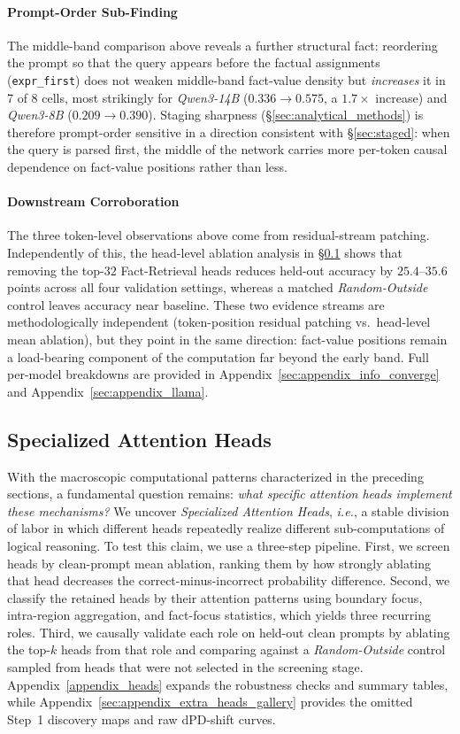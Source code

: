 \documentclass[11pt]{article}
\begin{document}
\paragraph{Prompt-Order Sub-Finding} The middle-band comparison above reveals a further structural fact: reordering the prompt so that the query appears before the factual assignments (\texttt{expr\_first}) does not weaken middle-band fact-value density but \emph{increases} it in 7 of 8 cells, most strikingly for \textit{Qwen3-14B} ($0.336 \to 0.575$, a $1.7\times$ increase) and \textit{Qwen3-8B} ($0.209 \to 0.390$). Staging sharpness (§\ref{sec:analytical_methods}) is therefore prompt-order sensitive in a direction consistent with §\ref{sec:staged}: when the query is parsed first, the middle of the network carries more per-token causal dependence on fact-value positions rather than less.

\paragraph{Downstream Corroboration} The three token-level observations above come from residual-stream patching. Independently of this, the head-level ablation analysis in §\ref{sec:heads} shows that removing the top-$32$ Fact-Retrieval heads reduces held-out accuracy by $25.4$--$35.6$ points across all four validation settings, whereas a matched \textit{Random-Outside} control leaves accuracy near baseline. These two evidence streams are methodologically independent (token-position residual patching vs.\ head-level mean ablation), but they point in the same direction: fact-value positions remain a load-bearing component of the computation far beyond the early band. Full per-model breakdowns are provided in Appendix~\ref{sec:appendix_info_converge} and Appendix~\ref{sec:appendix_llama}.

\subsection{Specialized Attention Heads}
\label{sec:heads}
With the macroscopic computational patterns characterized in the preceding sections, a fundamental question remains: \textit{what specific attention heads implement these mechanisms?} 
We uncover \textit{Specialized Attention Heads}, \textit{i.e.}, a stable division of labor in which different heads repeatedly realize different sub-computations of logical reasoning. To test this claim, we use a three-step pipeline. First, we screen heads by clean-prompt mean ablation, ranking them by how strongly ablating that head decreases the correct-minus-incorrect probability difference. Second, we classify the retained heads by their attention patterns using boundary focus, intra-region aggregation, and fact-focus statistics, which yields three recurring roles. Third, we causally validate each role on held-out clean prompts by ablating the top-$k$ heads from that role and comparing against a \textit{Random-Outside} control sampled from heads that were not selected in the screening stage. Appendix~\ref{appendix_heads} expands the robustness checks and summary tables, while Appendix~\ref{sec:appendix_extra_heads_gallery} provides the omitted Step~1 discovery maps and raw dPD-shift curves.
\end{document}
